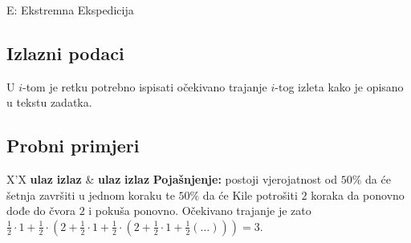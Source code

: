 \begin{statement}[
  timelimit=1 s,
  memorylimit=512 MiB,
]{E: Ekstremna Ekspedicija}
\subsection*{Izlazni podaci}
U $i$-tom je retku potrebno ispisati očekivano trajanje $i$-tog izleta kako
je opisano u tekstu zadatka.

\subsection*{Probni primjeri}
\begin{tabularx}{\textwidth}{X'X}
  \textbf{ulaz}
  \linespread{1}{}
  \textbf{izlaz}
  \linespread{1}{} &
  \textbf{ulaz}
  \linespread{1}{}
  \textbf{izlaz}
  \linespread{1}{}
  \textbf{Pojašnjenje:}
  postoji vjerojatnost od $50\%$ da će šetnja završiti u jednom koraku te $50\%$
  da će Kile potrošiti $2$ koraka da ponovno dođe do čvora $2$ i pokuša ponovno.
  Očekivano trajanje je zato $\frac{1}{2} \cdot 1 + \frac{1}{2} \cdot (2 +
  \frac{1}{2} \cdot 1 + \frac{1}{2} \cdot (2 + \frac{1}{2} \cdot 1 +
  \frac{1}{2}(\ldots))) = 3$.
\end{tabularx}


\end{statement}

